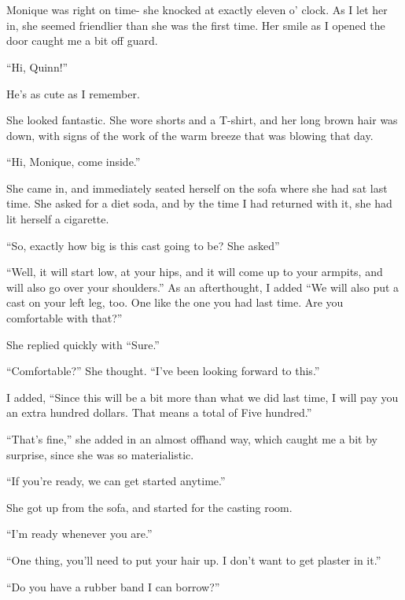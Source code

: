 \chapter{~}
Monique was right on time- she knocked at exactly eleven o' clock. As I let her in, she
seemed friendlier than she was the first time. Her smile as I opened the door caught me a bit
off guard.

``Hi, Quinn!''

\begin{thought}
He's as cute as I remember.
\end{thought}

She looked fantastic. She wore shorts and a T-shirt, and her long brown hair was down, with
signs of the work of the warm breeze that was blowing that day.

``Hi, Monique, come inside.''

She came in, and immediately seated herself on the sofa where she had sat last time. She
asked for a diet soda, and by the time I had returned with it, she had lit herself a cigarette.

``So, exactly how big is this cast going to be? She asked''

``Well, it will start low, at your hips, and it will come up to your armpits, and will also
go over your shoulders.'' As an afterthought, I added ``We will also put a cast on your left
leg,
too. One like the one you had last time. Are you comfortable with that?''

She replied quickly with ``Sure.''

\begin{thought}
``Comfortable?'' She thought. ``I've been looking forward to this.''
\end{thought}

I added, ``Since this will be a bit more than what we did last time, I will pay you an extra
hundred dollars. That means a total of Five hundred.''

``That's fine,'' she added in an almost offhand way, which caught me a bit by surprise, since
she was so materialistic.

``If you're ready, we can get started anytime.''

She got up from the sofa, and started for the casting room.

``I'm ready whenever you are.''

``One thing, you'll need to put your hair up. I don't want to get plaster in it.''

``Do you have a rubber band I can borrow?''

